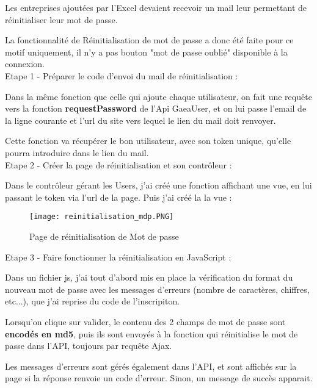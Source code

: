 
Les entreprises ajoutées par l'Excel devaient recevoir un mail leur permettant de réinitialiser leur mot de passe.

La fonctionnalité de Réinitialisation de mot de passe a donc été faite pour ce motif uniquement, il n'y a pas bouton "mot de passe oublié" disponible à la connexion.\\

Etape 1 - Préparer le code d'envoi du mail de réinitialisation : 

Dans la même fonction que celle qui ajoute chaque utilisateur, on fait une requête vers la fonction \textbf{requestPassword} de l'Api GaeaUser, et on lui passe l'email de la ligne courante et l'url du site vers lequel le lien du mail doit renvoyer.

Cette fonction va récupérer le bon utilisateur, avec son token unique, qu'elle pourra introduire dans le lien du mail.\\

Etape 2 - Créer la page de réinitialisation et son contrôleur : 

Dans le contrôleur gérant les Users, j'ai créé une fonction affichant une vue, en lui passant le token via l'url de la page.
Puis j'ai créé la la vue :

\begin{figure}[H]
    \texttt{[image: reinitialisation\_mdp.PNG]}
    \caption{Page de réinitialisation de Mot de passe}
\end{figure}

Etape 3 - Faire fonctionner la réinitialisation en JavaScript :

Dans un fichier js, j'ai tout d'abord mis en place la vérification du format du nouveau mot de passe avec les messages d'erreurs (nombre de caractères, chiffres, etc...), que j'ai reprise du code de l'inscripiton.

Lorsqu'on clique sur valider, le contenu des 2 champs de mot de passe sont \textbf{encodés en md5}, puis ils sont envoyés à la fonction qui réinitialise le mot de passe dans l'API, toujours par requête Ajax.

Les messages d'erreurs sont gérés également dans l'API, et sont affichés sur la page si la réponse renvoie un code d'erreur. Sinon, un message de succès apparait.

